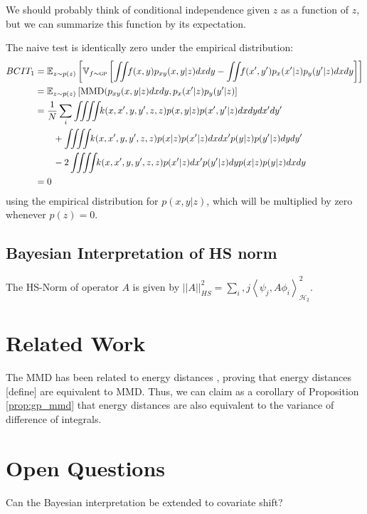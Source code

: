 \documentclass{article} %
\begin{document}
We should probably think of conditional independence given $z$ as a function of $z$, but we can summarize this function by its expectation.

The naive test is identically zero under the empirical distribution:
\begin{align}
BCIT_1 & = \expectargs{z\sim p(z)}{\varianceargs{f\sim \gp}{ \int \!\!\! \int\!\! f(x,y)p_{xy}(x,y|z)dxdy - \int \!\!\! \int\!\! f(x',y')p_x(x'|z)p_y(y'|z)dx dy}} \\
& = \expectargs{z\sim p(z)}{\mmd( p_{xy}(x,y|z)dxdy, p_x(x'|z)p_y(y'|z)} \\
& = \frac{1}{N} \sum_i \int \!\!\! \int \!\!\!\int \!\!\! \int\!\! k(x,x',y,y',z,z)p(x,y|z)p(x',y'|z)dxdydx'dy' \\
\nonumber & \qquad + \int \!\!\! \int\!\!\! \int \!\!\! \int\!\! k(x,x',y,y',z,z) p(x|z)p(x'|z)dxdx' p(y|z) p(y'|z) dydy' \\
\nonumber & \qquad - 2 \int \!\!\! \int \!\!\!\int \!\!\! \int\!\! k(x,x',y,y',z,z) p(x'|z) dx' p(y'|z)dy p(x|z) p(y|z) dx dy \\
& = 0
\end{align}
using the empirical distribution for $p(x,y|z)$, which will be multiplied by zero whenever $p(z) = 0$.


\subsection{Bayesian Interpretation of HS norm}

The HS-Norm of operator $A$ is given by $||A||_{HS}^2 = \sum_i,j \left\langle \psi_j, A \phi_i \right\rangle^2_{\mathcal{H}_2}$.


\section{Related Work}

The MMD has been related to energy distances \cite{sejdinovic2012hypothesis, sejdinovic2012equivalence}, proving that energy distances [define] are equivalent to MMD.  Thus, we can claim as a corollary of Proposition \ref{prop:gp_mmd} that energy distances are also equivalent to the variance of difference of integrals.

\section{Open Questions}

Can the Bayesian interpretation be extended to covariate shift?
\end{document}
